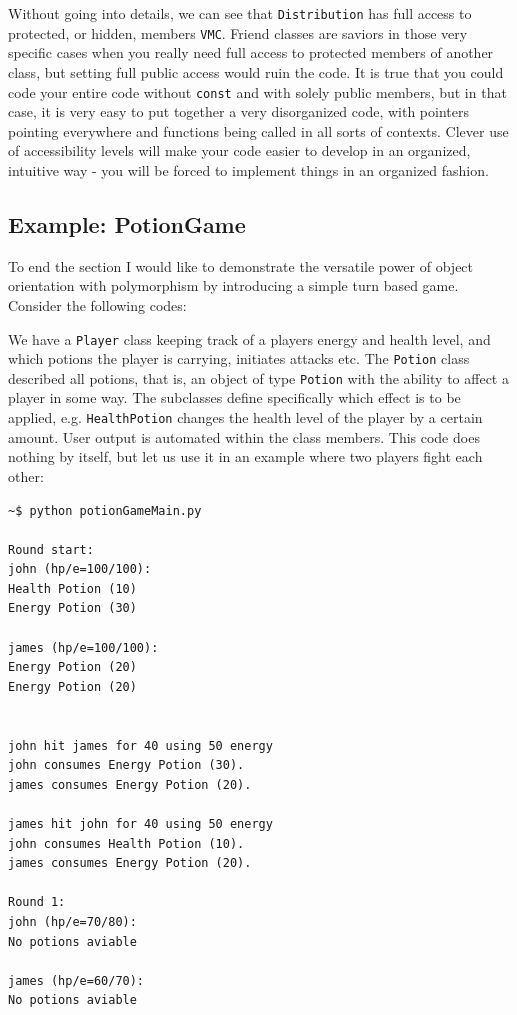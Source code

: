 Without going into details, we can see that \verb+Distribution+ has full access to protected, or hidden, members \verb+VMC+. Friend classes are saviors in those very specific cases when you really need full access to protected members of another class, but setting full public access would ruin the code. It is true that you could code your entire code without \verb+const+ and with solely public members, but in that case, it is very easy to put together a very disorganized code, with pointers pointing everywhere and functions being called in all sorts of contexts. Clever use of accessibility levels will make your code easier to develop in an organized, intuitive way - you will be forced to implement things in an organized fashion.

\subsection{Example: PotionGame}
\label{sec:PotionGame}

To end the section I would like to demonstrate the versatile power of object orientation with polymorphism by introducing a simple turn based game. Consider the following codes:

\vspace{0.5 cm}



We have a \verb+Player+ class keeping track of a players energy and health level, and which potions the player is carrying, initiates attacks etc. The \verb+Potion+ class described all potions, that is, an object of type \verb+Potion+ with the ability to affect a player in some way. The subclasses define specifically which effect is to be applied, e.g. \verb+HealthPotion+ changes the health level of the player by a certain amount. User output is automated within the class members. This code does nothing by itself, but let us use it in an example where two players fight each other:

\vspace{0.5 cm}


\begin{verbatim}
~$ python potionGameMain.py 

Round start: 
john (hp/e=100/100):
Health Potion (10)
Energy Potion (30)

james (hp/e=100/100):
Energy Potion (20)
Energy Potion (20)


john hit james for 40 using 50 energy
john consumes Energy Potion (30).
james consumes Energy Potion (20).

james hit john for 40 using 50 energy
john consumes Health Potion (10).
james consumes Energy Potion (20).

Round 1: 
john (hp/e=70/80):
No potions aviable

james (hp/e=60/70):
No potions aviable
\end{verbatim}



